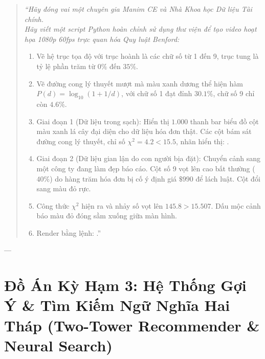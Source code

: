 \begin{simulationbox}
\begin{quote}
\small\itshape
``Hãy đóng vai một chuyên gia Manim CE và Nhà Khoa học Dữ liệu Tài chính. \\
Hãy viết một script Python hoàn chỉnh sử dụng thư viện  để tạo video hoạt họa 1080p 60fps trực quan hóa Quy luật Benford:
\begin{enumerate}
  \item Vẽ hệ trục tọa độ với trục hoành là các chữ số từ 1 đến 9, trục tung là tỷ lệ phần trăm từ $0\%$ đến $35\%$.
  \item Vẽ đường cong lý thuyết mượt mà màu xanh dương thể hiện hàm $P(d) = \log_{10}(1 + 1/d)$, với chữ số 1 đạt đỉnh $30.1\%$, chữ số 9 chỉ còn $4.6\%$.
  \item Giai đoạn 1 (Dữ liệu trong sạch): Hiển thị $1.000$ thanh bar biểu đồ cột màu xanh lá cây đại diện cho dữ liệu hóa đơn thật. Các cột bám sát đường cong lý thuyết, chỉ số $\chi^2 = 4.2 < 15.5$, nhãn hiển thị: .
  \item Giai đoạn 2 (Dữ liệu gian lận do con người bịa đặt): Chuyển cảnh sang một công ty đang làm đẹp báo cáo. Cột số 9 vọt lên cao bất thường ($40\%$) do hàng trăm hóa đơn bị cố ý định giá $\$990$ để lách luật. Cột đổi sang màu đỏ rực.
  \item Công thức $\chi^2$ hiện ra và nhảy số vọt lên $145.8 > 15.507$. Dấu mộc cảnh báo  màu đỏ đóng sầm xuống giữa màn hình.
  \item Render bằng lệnh: .''
\end{enumerate}
\end{quote}
\end{simulationbox}

---

\section{Đồ Án Kỳ Hạm 3: Hệ Thống Gợi Ý \& Tìm Kiếm Ngữ Nghĩa Hai Tháp (Two-Tower Recommender \& Neural Search)}
\label{sec:ch14-two-tower-recommender}

